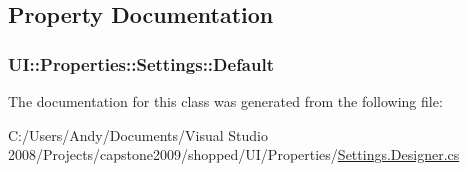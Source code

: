 \subsection{Property Documentation}
\hypertarget{class_u_i_1_1_properties_1_1_settings_a15a0e6993e5dd68352a2c6f989ad5943}{
\subsubsection[{Default}]{ UI::Properties::Settings::Default}}
\label{class_u_i_1_1_properties_1_1_settings_a15a0e6993e5dd68352a2c6f989ad5943}


The documentation for this class was generated from the following file:\begin{DoxyCompactItemize}
\item 
C:/Users/Andy/Documents/Visual Studio 2008/Projects/capstone2009/shopped/UI/Properties/\hyperlink{_settings_8_designer_8cs}{Settings.Designer.cs}\end{DoxyCompactItemize}
